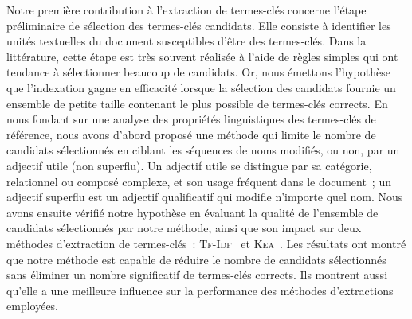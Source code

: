     Notre première contribution à l'extraction de termes-clés concerne l'étape
    préliminaire de sélection des termes-clés candidats. Elle consiste à
    identifier les unités textuelles du document susceptibles d'être des
    termes-clés. Dans la littérature, cette étape est très souvent réalisée à
    l'aide de règles simples qui ont tendance à sélectionner beaucoup de
    candidats. Or, nous émettons l'hypothèse que l'indexation gagne en
    efficacité lorsque la sélection des candidats fournie un ensemble de petite
    taille contenant le plus possible de termes-clés corrects.
    En nous fondant sur une analyse des propriétés linguistiques des termes-clés
    de référence, nous avons d'abord proposé une méthode qui limite le nombre de
    candidats sélectionnés en ciblant les séquences de noms modifiés, ou non,
    par un adjectif utile (non superflu). Un adjectif utile se distingue par sa
    catégorie, relationnel ou composé complexe, et son usage fréquent dans le
    document~; un adjectif superflu est un adjectif qualificatif qui modifie
    n'importe quel nom.
    Nous avons ensuite vérifié notre hypothèse en évaluant la qualité de
    l'ensemble de candidats sélectionnés par notre méthode, ainsi que son impact
    sur deux méthodes d'extraction de termes-clés~:
    \textsc{Tf-Idf}~\cite{salton1975tfidf} et \textsc{Kea}~\cite{witten1999kea}.
    Les résultats ont montré que notre méthode est capable de réduire le nombre
    de candidats sélectionnés sans éliminer un nombre significatif de
    termes-clés corrects. Ils montrent aussi qu'elle a une meilleure influence
    sur la performance des méthodes d'extractions employées.

